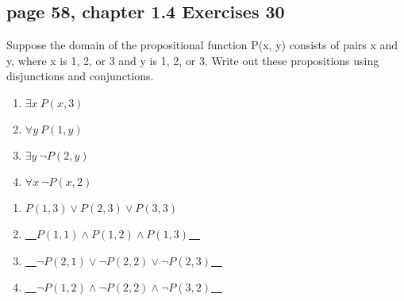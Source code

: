 \documentclass[sigconf]{acmart}
\begin{document}
\subsection{page 58, chapter 1.4 Exercises 30}
\begin{shaded}
    Suppose the domain of the propositional function P(x, y) consists of pairs x and y, where x is 1, 2, or 3 and y is 1, 2, or 3. Write out these propositions using disjunctions and conjunctions.
    \begin{enumerate}[label=(\alph*)]
        \item $\exists x ~ P(x,3)$
        \item $\forall y ~ P(1,y)$
        \item $\exists y ~ \neg P(2,y)$
        \item $\forall x ~ \neg P(x,2)$
    \end{enumerate}
\end{shaded} 
\begin{enumerate}[label=(\alph*)]
	\item$ P(1,3) \vee P(2,3) \vee P(3,3) $
	\item \underline{~~$P(1,1) \land P(1,2) \land P(1,3)$~~}
	\item \underline{~~$\neg P(2,1) \lor \neg P(2,2) \lor \neg P(2,3)$~~} 
	\item \underline{~~$\neg P(1,2) \land \neg P(2,2) \land \neg P(3,2)$~~}
\end{enumerate}
\end{document}
